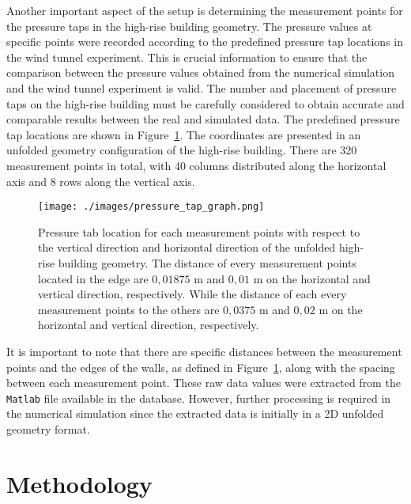 \documentclass[12pt,a4paper]{cibb}
\begin{document}
\newpage
Another important aspect of the setup is determining the measurement points for the pressure taps in the high-rise building geometry. The pressure values at specific points were recorded according to the predefined pressure tap locations in the wind tunnel experiment. This is crucial information to ensure that the comparison between the pressure values obtained from the numerical simulation and the wind tunnel experiment is valid. 
The number and placement of pressure taps on the high-rise building must be carefully considered to obtain accurate and comparable results between the real and simulated data. The predefined pressure tap locations are shown in Figure~\ref{fig:measurementPointLoc}. The coordinates are presented in an unfolded geometry configuration of the high-rise building. There are 320 measurement points in total, with 40 columns distributed along the horizontal axis and 8 rows along the vertical axis. 

\begin{figure}[h]
\vspace{1mm}
 \begin{center}
\texttt{[image: ./images/pressure\_tap\_graph.png]}
\caption{
Pressure tab location for each measurement points with respect to the vertical direction and horizontal direction of the unfolded high-rise building geometry. The distance of every measurement points located in the edge are $0,01875$ m and $0,01$ m on the horizontal and vertical direction, respectively. While the distance of each every measurement points to the others are $0,0375$ m and $0,02$ m on the horizontal and vertical direction, respectively.}
\label{fig:measurementPointLoc}
\vspace{-5mm}
\end{center}
\end{figure}

It is important to note that there are specific distances between the measurement points and the edges of the walls, as defined in Figure~\ref{fig:measurementPointLoc}, along with the spacing between each measurement point. These raw data values were extracted from the \texttt{Matlab} file available in the database. However, further processing is required in the numerical simulation since the extracted data is initially in a 2D unfolded geometry format.

\section{\bf Methodology}
\label{sec:DATA-AND-METHODS}
\end{document}
